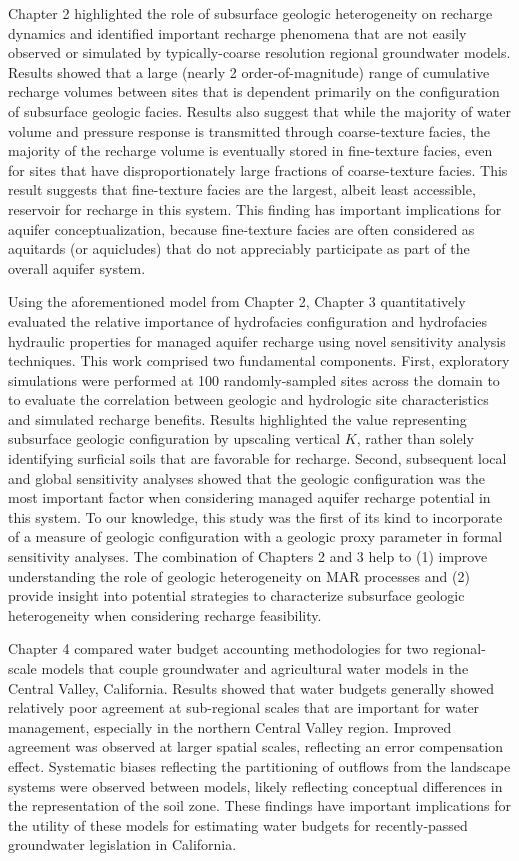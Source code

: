 Chapter 2 highlighted the role of subsurface geologic heterogeneity on recharge dynamics and identified important recharge phenomena that are not easily observed or simulated by typically-coarse resolution regional groundwater models. Results showed that a large (nearly 2 order-of-magnitude) range of cumulative recharge volumes between sites that is dependent primarily on the configuration of subsurface geologic facies. Results also suggest that while the majority of water volume and pressure response is transmitted through coarse-texture facies, the majority of the recharge volume is eventually stored in fine-texture facies, even for sites that have disproportionately large fractions of coarse-texture facies. This result suggests that fine-texture facies are the largest, albeit least accessible, reservoir for recharge in this system. This finding has important implications for aquifer conceptualization, because fine-texture facies are often considered as aquitards (or aquicludes) that do not appreciably participate as part of the overall aquifer system.

Using the aforementioned model from Chapter 2, Chapter 3 quantitatively evaluated the relative importance of hydrofacies configuration and hydrofacies hydraulic properties for managed aquifer recharge using novel sensitivity analysis techniques. This work comprised two fundamental components. First, exploratory simulations were performed at 100 randomly-sampled sites across the domain to to evaluate the correlation between geologic and hydrologic site characteristics and simulated recharge benefits. Results highlighted the value representing subsurface geologic configuration by upscaling vertical $K$, rather than solely identifying surficial soils that are favorable for recharge. Second, subsequent local and global sensitivity analyses showed that the geologic configuration was the most important factor when considering managed aquifer recharge potential in this system. To our knowledge, this study was the first of its kind to incorporate of a measure of geologic configuration with a geologic proxy parameter in formal sensitivity analyses. The combination of Chapters 2 and 3 help to (1) improve understanding the role of geologic heterogeneity on MAR processes and (2) provide insight into potential strategies to characterize subsurface geologic heterogeneity when considering recharge feasibility.

Chapter 4 compared water budget accounting methodologies for two regional-scale models that couple groundwater and agricultural water models in the Central Valley, California. Results showed that water budgets generally showed relatively poor agreement at sub-regional scales that are important for water management, especially in the northern Central Valley region. Improved agreement was observed at larger spatial scales, reflecting an error compensation effect. Systematic biases reflecting the partitioning of outflows from the landscape systems were observed between models, likely reflecting conceptual differences in the representation of the soil zone. These findings have important implications for the utility of these models for estimating water budgets for recently-passed groundwater legislation in California.

